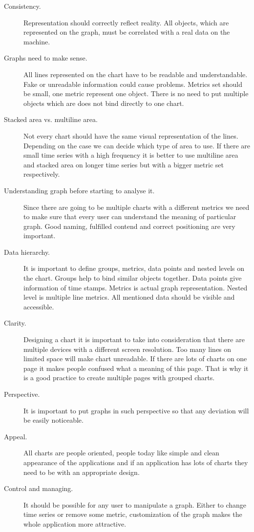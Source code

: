 \begin{description}
\item[Consistency.] Representation should correctly reflect reality. All objects, which are represented on the graph, must be correlated with a real data on the machine. 
\item[Graphs need to make sense.]  All lines represented on the chart have to be readable and understandable.  Fake or unreadable information could cause problems. Metrics set should be small, one metric represent one object. There is no need to put multiple objects which are does not bind directly to one chart.
\item[Stacked area vs. multiline area.] Not every chart should have the same visual representation of the lines. Depending on the case we can decide which type of area to use.  If there are small time series with a high frequency it is better to use multiline area and stacked area on longer time series but with a bigger metric set respectively. 
\item[Understanding graph before starting to analyse it. ] Since there are going to be multiple charts with a different metrics we need to make sure that every user can understand the meaning of particular graph. Good naming, fulfilled contend and correct positioning are very important.
\item[Data hierarchy. ] It is important to define groups, metrics, data points and nested levels on the chart.  Groups help to bind similar objects together. Data points give information of time stamps. Metrics is actual graph representation. Nested level is multiple line metrics. All mentioned data should be visible and accessible. 
\item[Clarity.] Designing a chart it is important to take into consideration that there are multiple devices with a different screen resolution. Too many lines on limited space will make chart unreadable.  If there are lots of charts on one page it makes people confused what a meaning of this page. That is why it is a good practice to create multiple pages with grouped charts. 
\item[Perspective.] It is important to put graphs in such perspective so that any deviation will be easily noticeable. 
\item[Appeal.] All charts are people oriented, people today like simple and clean appearance of the applications and if an application has lots of charts they need to be with an appropriate design.  
\item[Control and managing.] It should be possible for any user to manipulate a graph. Either to change time series or remove some metric, customization of the graph makes the whole application more attractive.
\end{description}

